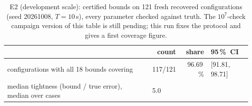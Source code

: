 \begin{table}[t]
\caption{E2 (development scale): certified bounds on 121 fresh recovered
configurations (seed 20261008, $T{=}10$\,s), every parameter checked
against truth. The $10^{7}$-check campaign version of this table is still
pending; this run fixes the protocol and gives a first coverage figure.}
\label{tab:e2}
\centering\small
\begin{tabular}{lrrl}
\toprule
 & count & share & 95\,\%~CI\\
\midrule
configurations with all 18 bounds covering & 117/121 & 96.69\,\% & [91.81, 98.71]\\
median tightness (bound / true error), median over cases & \multicolumn{3}{l}{5.0}\\
\bottomrule
\end{tabular}
\end{table}
